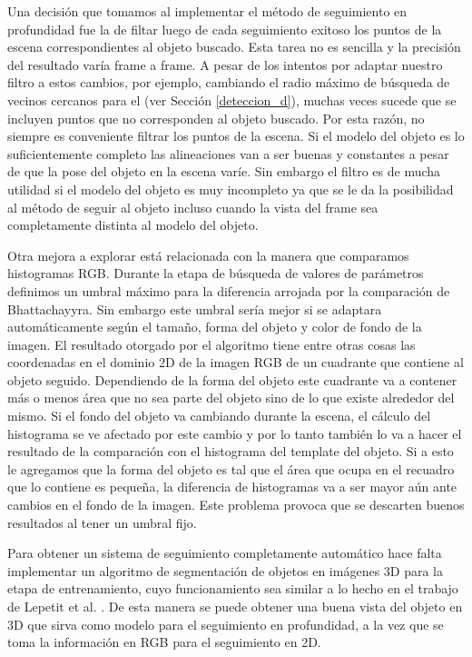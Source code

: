 Una decisión que tomamos al implementar el método de seguimiento en profundidad fue la de filtar luego de cada seguimiento exitoso los puntos de la escena correspondientes al objeto buscado. Esta tarea no es sencilla y la precisión del resultado varía frame a frame. A pesar de los intentos por adaptar nuestro filtro a estos cambios, por ejemplo, cambiando el radio máximo de búsqueda de vecinos cercanos para el \kdt (ver Sección \ref{deteccion_d}), muchas veces sucede que se incluyen puntos que no corresponden al objeto buscado. Por esta razón, no siempre es conveniente filtrar los puntos de la escena. Si el modelo del objeto es lo suficientemente completo las alineaciones van a ser buenas y constantes a pesar de que la pose del objeto en la escena varíe. Sin embargo el filtro es de mucha utilidad si el modelo del objeto es muy incompleto ya que se le da la posibilidad al método de seguir al objeto incluso cuando la vista del frame sea completamente distinta al modelo del objeto.

Otra mejora a explorar está relacionada con la manera que comparamos histogramas RGB. Durante la etapa de búsqueda de valores de parámetros definimos un umbral máximo para la diferencia arrojada por la comparación de Bhattachayyra. Sin embargo este umbral sería mejor si se adaptara automáticamente según el tamaño, forma del objeto y color de fondo de la imagen. El resultado otorgado por el algoritmo tiene entre otras cosas las coordenadas en el dominio 2D de la imagen RGB de un cuadrante que contiene al objeto seguido. Dependiendo de la forma del objeto este cuadrante va a contener más o menos área que no sea parte del objeto sino de lo que existe alrededor del mismo. Si el fondo del objeto va cambiando durante la escena, el cálculo del histograma se ve afectado por este cambio y por lo tanto también lo va a hacer el resultado de la comparación con el histograma del template del objeto. Si a esto le agregamos que la forma del objeto es tal que el área que ocupa en el recuadro que lo contiene es pequeña, la diferencia de histogramas va a ser mayor aún ante cambios en el fondo de la imagen. Este problema provoca que se descarten buenos resultados al tener un umbral fijo.

Para obtener un sistema de seguimiento completamente automático hace falta implementar un algoritmo de segmentación de objetos en imágenes 3D para la etapa de entrenamiento, cuyo funcionamiento sea similar a lo hecho en el trabajo de Lepetit et al. \cite{park2011texture}. De esta manera se puede obtener una buena vista del objeto en 3D que sirva como modelo para el seguimiento en profundidad, a la vez que se toma la información en RGB para el seguimiento en 2D.

